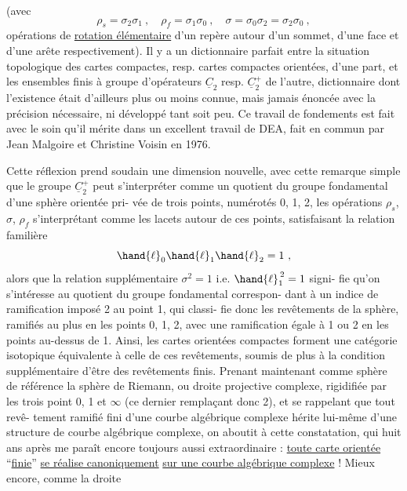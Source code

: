 
(avec
\[ \rho_s = \sigma_2\sigma_1 \ , \quad \rho_f = \sigma_1\sigma_0 \ , \quad \sigma = \sigma_0\sigma_2 = \sigma_2\sigma_0 \ , \]
opérations de \uline{rotation élémentaire} d'un repère autour d'un sommet,
d'une face et d'une arête respectivement). Il y a un dictionnaire
parfait entre la situation topologique des cartes compactes, resp.
cartes compactes orientées, d'une part, et les ensembles finis à
groupe d'opérateurs $\underline{C}_2$ resp. $\underline{C}_2^+$ de l'autre, dictionnaire dont
l'existence était d'ailleurs plus ou moins connue, mais jamais
énoncée avec la précision nécessaire, ni développé tant soit peu.
Ce travail de fondements est fait avec le soin qu'il mérite dans
un excellent travail de DEA, fait en commun par Jean Malgoire et
Christine Voisin en 1976.

Cette réflexion prend soudain une dimension nouvelle,
avec cette remarque simple que le groupe $\underline{C}_2^+$ peut s'interpréter
comme un quotient du groupe fondamental d'une sphère orientée pri-
vée de trois points, numérotés 0, 1, 2, les opérations $\rho_s$, $\sigma$, $\rho_f$
s'interprétant comme les lacets autour de ces points, satisfaisant
la relation familière
\[ \hand{\ell}_0\hand{\ell}_1\hand{\ell}_2 = 1 \ , \]
alors que la relation supplémentaire $\sigma^2 = 1$ i.e. $\hand{\ell}_1^{\,2} = 1$ signi-%
fie qu'on s'intéresse au quotient du groupe fondamental correspon-%
dant à un indice de ramification imposé 2 au point 1, qui classi-%
fie donc les revêtements de la sphère, ramifiés au plus en les
points 0, 1, 2, avec une ramification égale à 1 ou 2 en les points
au-dessus de 1. Ainsi, les cartes orientées compactes forment une
catégorie isotopique équivalente à celle de ces revêtements, soumis
de plus à la condition supplémentaire d'être des revêtements finis.
Prenant maintenant comme sphère de référence la sphère de Riemann,
ou droite projective complexe, rigidifiée par les trois point 0, 1
et $\infty$ (ce dernier remplaçant donc 2), et se rappelant que tout revê-%
tement ramifié fini d'une courbe algébrique complexe hérite lui-même
d'une structure de courbe algébrique complexe, on aboutit à cette
constatation, qui huit ans après me paraît encore toujours aussi
extraordinaire : \uline{toute carte orientée} ``\uline{finie}'' \uline{se réalise canoniquement}
\uline{sur une courbe algébrique complexe} ! Mieux encore, comme la droite

